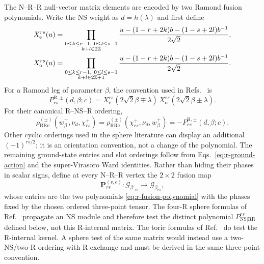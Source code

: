 \documentclass[11pt]{article}
\newcommand{\NS}{\mathrm{NS}}
\newcommand{\R}{\mathrm{R}}
\newcommand{\G}{\mathcal G}
\begin{document}
The N--R--R null-vector matrix elements are encoded by two Ramond fusion
polynomials.  Write the NS weight as $d=h(\lambda)$ and first define
\begin{align}
 X_{\mathrm e}^{rs}(u)
 &=\prod_{\substack{0\le k\le r-1,\ 0\le l\le s-1\\k+l\in2\mathbb Z}}
 \frac{u-(1-r+2k)b-(1-s+2l)b^{-1}}{2\sqrt2},
 \notag\\
 X_{\mathrm o}^{rs}(u)
 &=\prod_{\substack{0\le k\le r-1,\ 0\le l\le s-1\\k+l\in2\mathbb Z+1}}
 \frac{u-(1-r+2k)b-(1-s+2l)b^{-1}}{2\sqrt2}.
 \label{eq:r-x-polynomials}
\end{align}
For a Ramond leg of parameter $\beta$, the convention used in
Refs.~\cite{Suchanek2011EllipticRecursion,HadaszJaskolskiSuchanek2012Toric}
is
\begin{equation}
 P_{rs}^{\R,\pm}(d,\beta;c)
 =X_{\mathrm e}^{rs}(2\sqrt2\beta\mp\lambda)\,
  X_{\mathrm o}^{rs}(2\sqrt2\beta\pm\lambda).
 \label{eq:r-fusion-polynomial}
\end{equation}
For their canonical R--NS--R ordering,
\begin{equation}
 \rho_{\mathrm{RRe}}^{(\pm)}
   (w^+_\beta,\nu_d,\chi^+_{rs})
 =\rho_{\mathrm{RRe}}^{(\pm)}
   (\chi^+_{rs},\nu_d,w^+_\beta)
 =-P_{rs}^{\R,\pm}(d,\beta;c).
 \label{eq:r-null-three-point}
\end{equation}
Other cyclic orderings used in the sphere literature can display an
additional $(-1)^{rs/2}$; it is an orientation convention, not a change of
the polynomial.
The remaining ground-state entries and slot orderings follow from
Eqs.~\eqref{eq:r-ground-action} and the super-Virasoro Ward identities.
Rather than hiding their phases in scalar signs, define at every N--R--R
vertex the $2\times2$ fusion map
\begin{equation}
 \mathbf P_{rs}^{(v,e)}:
 \G_{\beta'_{rs}}\longrightarrow\G_{\beta_{rs}},
 \label{eq:r-fusion-map}
\end{equation}
whose entries are the two polynomials
\eqref{eq:r-fusion-polynomial} with the phases fixed by the chosen ordered
three-point tensor.  The four-R sphere formulas of
Ref.~\cite{HadaszJaskolskiSuchanek2008RamondBlocks} propagate an NS module
and therefore test the distinct polynomial
$P_{\NS|\R\R}^{rs}$ defined below, not this R-internal matrix.  The toric
formulas of Ref.~\cite{HadaszJaskolskiSuchanek2012Toric} do test the
R-internal kernel.  A sphere test of the same matrix would instead use a
two-NS/two-R ordering with R exchange and must be derived in the same
three-point convention.
\end{document}
